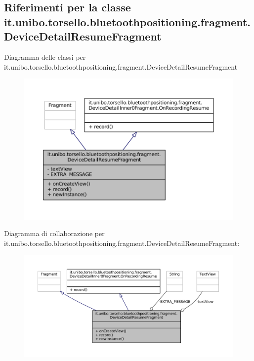 \hypertarget{classit_1_1unibo_1_1torsello_1_1bluetoothpositioning_1_1fragment_1_1DeviceDetailResumeFragment}{}\subsection{Riferimenti per la classe it.\+unibo.\+torsello.\+bluetoothpositioning.\+fragment.\+Device\+Detail\+Resume\+Fragment}
\label{classit_1_1unibo_1_1torsello_1_1bluetoothpositioning_1_1fragment_1_1DeviceDetailResumeFragment}


Diagramma delle classi per it.\+unibo.\+torsello.\+bluetoothpositioning.\+fragment.\+Device\+Detail\+Resume\+Fragment
\nopagebreak
\begin{figure}[H]
\begin{center}
\leavevmode
\includegraphics[width=350pt]{classit_1_1unibo_1_1torsello_1_1bluetoothpositioning_1_1fragment_1_1DeviceDetailResumeFragment__inherit__graph}
\end{center}
\end{figure}


Diagramma di collaborazione per it.\+unibo.\+torsello.\+bluetoothpositioning.\+fragment.\+Device\+Detail\+Resume\+Fragment\+:
\nopagebreak
\begin{figure}[H]
\begin{center}
\leavevmode
\includegraphics[width=350pt]{classit_1_1unibo_1_1torsello_1_1bluetoothpositioning_1_1fragment_1_1DeviceDetailResumeFragment__coll__graph}
\end{center}
\end{figure}
